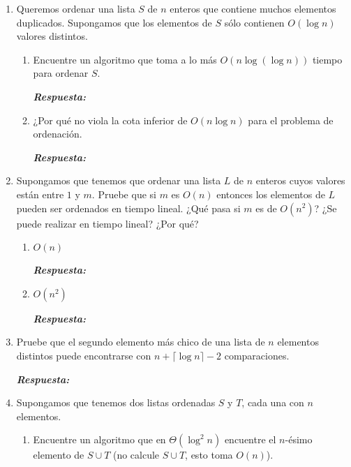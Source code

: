 \documentclass[11pt,letterpaper]{article}
\newcommand\respuesta{\textbf{\textit{Respuesta: }}}
\begin{document}
  \begin{enumerate}[leftmargin=*]
    \item Queremos ordenar una lista $S$ de $n$ enteros que contiene muchos elementos duplicados.
    Supongamos que los elementos de $S$ sólo contienen $O(\log n)$ valores distintos.

    \begin{enumerate}[label=\alph*)]
        \item Encuentre un algoritmo que toma a lo más $O(n \log (\log n))$ tiempo para ordenar $S$.
        
        \respuesta
        
        \item ¿Por qué no viola la cota inferior de $O(n \log n)$ para el problema de ordenación.
        
        \respuesta
    \end{enumerate}

    \item Supongamos que tenemos que ordenar una lista $L$ de $n$ enteros cuyos valores están entre $1$ y $m$.
    Pruebe que si $m$ es $O(n)$ entonces los elementos de $L$ pueden ser ordenados en tiempo lineal.
    ¿Qué pasa si $m$ es de $O(n^2)$? ¿Se puede realizar en tiempo lineal? ¿Por qué?

    \begin{enumerate}[label=\alph*)]
        \item $O(n)$
        
        \respuesta

        \item $O(n^2)$
        
        \respuesta
    \end{enumerate}

    \item Pruebe que el segundo elemento más chico de una lista de $n$ elementos distintos puede encontrarse con $n + \lceil \log n \rceil - 2$ comparaciones.
    
    \respuesta

    \item Supongamos que tenemos dos listas ordenadas $S$ y $T$, cada una con $n$ elementos.
    
    \begin{enumerate}[label=\alph*)]
        \item Encuentre un algoritmo que en $\Theta (\log^2 n)$ encuentre el $n$-ésimo elemento de $S \cup T$ (no calcule $S \cup T$, esto toma $O(n)$).
        

\end{enumerate}
\end{enumerate}
\end{document}
